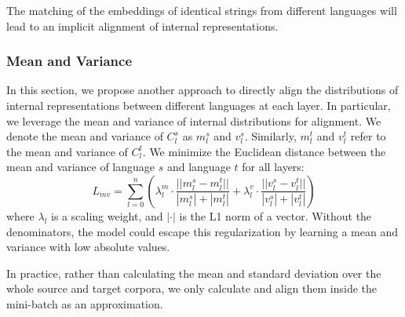 \documentclass[11pt,a4paper]{article}
\begin{document}
	
	The matching of the embeddings of identical strings from different languages will lead to an implicit alignment of internal representations. 
	
	\subsubsection*{Mean and Variance}
	In this section, we propose another approach to directly align the distributions of internal representations between different languages at each layer. In particular, we leverage the mean and variance of internal distributions for alignment. We denote the mean and variance of $C_l^s$ as $m_{l}^s$ and $v_{l}^s$. Similarly, $m_{l}^t$ and $v_{l}^t$ refer to the mean and variance of $C_l^t$. We minimize the Euclidean distance between the mean and variance of language $s$ and language $t$ for all layers:
	\begin{equation*}
	L_{mv} = \sum_{l=0}^n (\lambda_{l}^m \cdot \dfrac{||m_{l}^s - m_{l}^t||}{|m_{l}^s| + |m_{l}^t|} + \lambda_{l}^v \cdot \dfrac{||v_{l}^s - v_{l}^t||}{|v_{l}^s| + |v_{l}^t|})
	\end{equation*}
	where $\lambda_{l}$ is a scaling weight, and $|\cdot|$ is the L1 norm of a vector. Without the denominators, the model could escape this regularization by learning a mean and variance with low absolute values.
	
	In practice, rather than calculating the mean and standard deviation over the whole source and target corpora, we only calculate and align them inside the mini-batch as an approximation.
	
\end{document}
